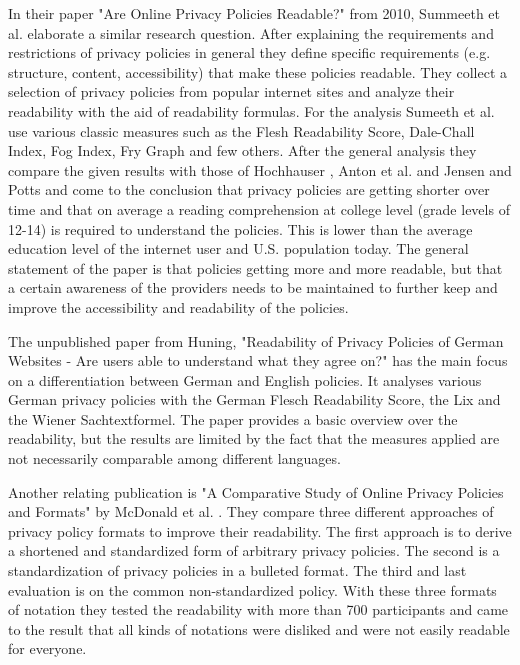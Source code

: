 \documentclass[runningheads,a4paper]{llncs}
\begin{document}
In their paper "Are Online Privacy Policies Readable?" from 2010, Summeeth et al.\cite{Sumeeth2010} elaborate a similar research question. After explaining the requirements and restrictions of privacy policies in general they define specific requirements (e.g. structure, content, accessibility) that make these policies readable. They collect a selection of privacy policies from popular internet sites and analyze their readability with the aid of readability formulas. For the analysis Sumeeth et al. use various classic measures such as the Flesh Readability Score, Dale-Chall Index, Fog Index, Fry Graph and few others. After the general analysis they compare the given results with those of Hochhauser \cite{hochhauser2002}, Anton et al. \cite{Anton2004} and Jensen and Potts \cite{Jensen2004} and come to the conclusion that privacy policies are getting shorter over time and that on average a reading comprehension at college level (grade levels of 12-14) is required to understand the policies. This is lower than the average education level of the internet user and U.S. population today. The general statement of the paper is that policies getting more and more readable, but that a certain awareness of the providers needs to be maintained to further keep and improve the accessibility and readability of the policies.

The unpublished paper from Huning, "Readability of Privacy Policies of German Websites - Are users able to understand what they agree on?" \cite{Huning2010} has the main focus on a differentiation between German and English policies. It analyses various German privacy policies with the German Flesch Readability Score, the Lix and the Wiener Sachtextformel. The paper provides a basic overview over the readability, but the results are limited by the fact that the measures applied are not necessarily comparable among different languages.

Another relating publication is "A Comparative Study of Online Privacy Policies and Formats" by McDonald et al. \cite{Mcdonald2009}. They compare three different approaches of privacy policy formats to improve their readability. The first approach is to derive a shortened and standardized form of arbitrary privacy policies. The second is a standardization of privacy policies in a bulleted format. The third and last evaluation is on the common non-standardized policy. With these three formats of notation they tested the readability with more than 700 participants and came to the result that all kinds of notations were disliked and were not easily readable for everyone.
\end{document}
